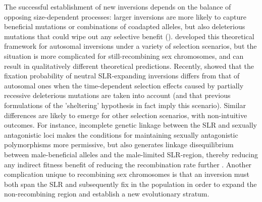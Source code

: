\documentclass{article}[12pt]
\begin{document}
The successful establishment of new inversions depends on the balance of opposing size-dependent processes: larger inversions are more likely to capture beneficial mutations or combinations of coadapted alleles, but also deleterious mutations that could wipe out any selective benefit (\citealt{Nei1967,vanValenLevins1968, Santos1986, ChengKirkpatrick2019}). \citet{ConnallonOlito2021} developed this theoretical framework for autosomal inversions under a variety of selection scenarios, but the situation is more complicated for still-recombining sex chromosomes, and can result in qualitatively different theoretical predictions. Recently, \citet{Olito-etal-2022} showed that the fixation probability of neutral SLR-expanding inversions differs from that of autosomal ones when the time-dependent selection effects caused by partially recessive deleterious mutations are taken into account (and that previous formulations of the 'sheltering' hypothesis in fact imply this scenario). Similar differences are likely to emerge for other selection scenarios, with non-intuitive outcomes. For instance, incomplete genetic linkage between the SLR and sexually antagonistic loci makes the conditions for maintaining sexually antagonistic polymorphisms more permissive, but also generates linkage disequilibrium between male-beneficial alleles and the male-limited SLR-region, thereby reducing any indirect fitness benefit of reducing the recombination rate further \citep{Nei1969, JordanCharlesworth2012, Otto2019}. Another complication unique to recombining sex chromosomes is that an inversion must both span the SLR and subsequently fix in the population in order to expand the non-recombining region and establish a new evolutionary stratum.
\end{document}
